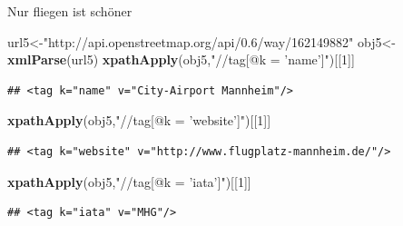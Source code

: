 \documentclass[ignorenonframetext,]{beamer}
\newenvironment{Shaded}{\begin{snugshade}}{\end{snugshade}}
\newcommand{\KeywordTok}[1]{\textcolor[rgb]{0.13,0.29,0.53}{\textbf{#1}}}
\newcommand{\DecValTok}[1]{\textcolor[rgb]{0.00,0.00,0.81}{#1}}
\newcommand{\StringTok}[1]{\textcolor[rgb]{0.31,0.60,0.02}{#1}}
\newcommand{\NormalTok}[1]{#1}
\begin{document}
\begin{frame}[fragile]{Nur fliegen ist schöner}

\begin{Shaded}
\begin{Highlighting}[]
\NormalTok{url5<-}\StringTok{"http://api.openstreetmap.org/api/0.6/way/162149882"}
\NormalTok{obj5<-}\KeywordTok{xmlParse}\NormalTok{(url5)}
\KeywordTok{xpathApply}\NormalTok{(obj5,}\StringTok{"//tag[@k = 'name']"}\NormalTok{)[[}\DecValTok{1}\NormalTok{]]}
\end{Highlighting}
\end{Shaded}

\begin{verbatim}
## <tag k="name" v="City-Airport Mannheim"/>
\end{verbatim}

\begin{Shaded}
\begin{Highlighting}[]
\KeywordTok{xpathApply}\NormalTok{(obj5,}\StringTok{"//tag[@k = 'website']"}\NormalTok{)[[}\DecValTok{1}\NormalTok{]]}
\end{Highlighting}
\end{Shaded}

\begin{verbatim}
## <tag k="website" v="http://www.flugplatz-mannheim.de/"/>
\end{verbatim}

\begin{Shaded}
\begin{Highlighting}[]
\KeywordTok{xpathApply}\NormalTok{(obj5,}\StringTok{"//tag[@k = 'iata']"}\NormalTok{)[[}\DecValTok{1}\NormalTok{]]}
\end{Highlighting}
\end{Shaded}

\begin{verbatim}
## <tag k="iata" v="MHG"/>
\end{verbatim}

\end{frame}
\end{document}
